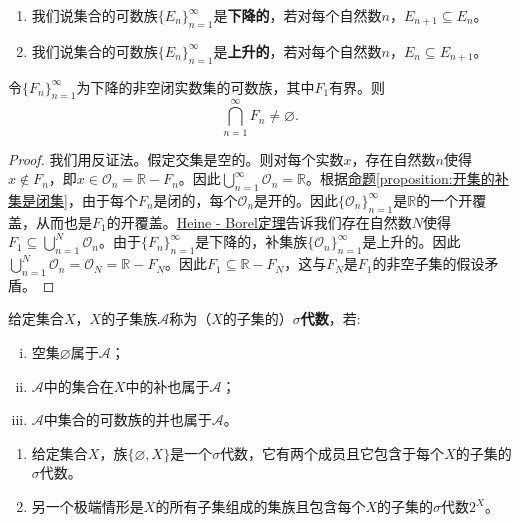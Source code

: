 \documentclass[lang=cn,newtx,10pt,scheme=chinese]{../Template/elegantbook}
\begin{document}
\begin{definition}[集族的下降与上升]\label{definition:集族的下降与上升}
\begin{enumerate}
  \item 我们说集合的可数族\(\{E_n\}_{n = 1}^{\infty}\)是\textbf{下降的}，若对每个自然数\(n\)，\(E_{n + 1}\subseteq E_n\)。

  \item 我们说集合的可数族\(\{E_n\}_{n = 1}^{\infty}\)是\textbf{上升的}，若对每个自然数\(n\)，\(E_n\subseteq E_{n + 1}\)。
\end{enumerate}
\end{definition}

\begin{theorem}[集套定理]\label{theorem:集套定理}
  令\(\{F_n\}_{n = 1}^{\infty}\)为下降的非空闭实数集的可数族，其中\(F_1\)有界。则
\[\bigcap_{n = 1}^{\infty}F_n\neq\varnothing.\]
\end{theorem}
\begin{proof}
  我们用反证法。假定交集是空的。则对每个实数\(x\)，存在自然数\(n\)使得\(x\notin F_n\)，即\(x\in\mathcal{O}_n=\mathbb{R}- F_n\)。因此\(\bigcup_{n = 1}^{\infty}\mathcal{O}_n=\mathbb{R}\)。根据\hyperref[proposition:开集的补集是闭集]{命题\ref{proposition:开集的补集是闭集}}，由于每个\(F_n\)是闭的，每个\(\mathcal{O}_n\)是开的。因此\(\{\mathcal{O}_n\}_{n = 1}^{\infty}\)是\(\mathbb{R}\)的一个开覆盖，从而也是\(F_1\)的开覆盖。\hyperref[theorem:Heine - Borel定理]{Heine - Borel定理}告诉我们存在自然数\(N\)使得\(F_1\subseteq\bigcup_{n = 1}^{N}\mathcal{O}_n\)。由于\(\{F_n\}_{n = 1}^{\infty}\)是下降的，补集族\(\{\mathcal{O}_n\}_{n = 1}^{\infty}\)是上升的。因此\(\bigcup_{n = 1}^{N}\mathcal{O}_n=\mathcal{O}_N=\mathbb{R}- F_N\)。因此\(F_1\subseteq\mathbb{R}- F_N\)，这与\(F_N\)是\(F_1\)的非空子集的假设矛盾。
\end{proof}

\begin{definition}[$\sigma$代数]\label{definition: sigma 代数}
  给定集合\(X\)，\(X\)的子集族\(\mathcal{A}\)称为（\(X\)的子集的）\textbf{\(\sigma\)代数}，若:
  \begin{enumerate}[(i)]
    \item 空集\(\varnothing\)属于\(\mathcal{A}\)；

    \item \(\mathcal{A}\)中的集合在\(X\)中的补也属于\(\mathcal{A}\)；

    \item \(\mathcal{A}\)中集合的可数族的并也属于\(\mathcal{A}\)。
  \end{enumerate}
\end{definition}
\begin{note}
\begin{enumerate}[(1)]
  \item 给定集合\(X\)，族\(\{\varnothing, X\}\)是一个\(\sigma\)代数，它有两个成员且它包含于每个\(X\)的子集的\(\sigma\)代数。

  \item 另一个极端情形是\(X\)的所有子集组成的集族且包含每个\(X\)的子集的\(\sigma\)代数\(2^X\)。
\end{enumerate}
\end{note}
\end{document}
